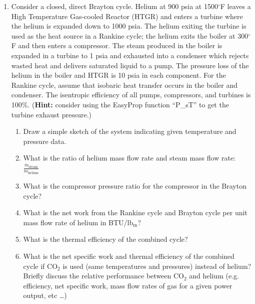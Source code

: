\begin{fullwidth}
\begin{enumerate}
\vspace{1.5 cm}

\item Consider a closed, direct Brayton cycle.  Helium at 900 psia at 1500$^{\circ}$F leaves a High Temperature Gas-cooled Reactor (HTGR) and enters a turbine where the helium is expanded down to 1000 psia.  The helium exiting the turbine is used as the heat source in a Rankine cycle; the helium exits the boiler at 300$^{\circ}$F and then enters a compressor.  The steam produced in the boiler is expanded in a turbine to 1 psia and exhausted into a condenser which rejects wasted heat and delivers saturated liquid to a pump.  The pressure loss of the helium in the boiler and HTGR is 10 psia in each component.  For the Rankine cycle, assume that isobaric heat transfer occurs in the boiler and condenser.  The isentropic efficiency of all pumps, compressors, and turbines is 100\%. (\textbf{Hint:} consider using the EasyProp function ``P\_sT'' to get the turbine exhaust pressure.)

\begin{enumerate}
\item Draw a simple sketch of the system indicating given temperature and pressure data.
\item What is the ratio of helium mass flow rate and steam mass flow rate: $\frac{\dot{m}_{\text{steam}}}{\dot{m}_{\text{helium}}}$
\item What is the compressor pressure ratio for the compressor in the Brayton cycle?
\item What is the net work from the Rankine cycle and Brayton cycle  per unit mass flow rate of helium in BTU/lb$_{\text{m}}$?
\item What is the thermal efficiency of the combined cycle?
\item What is the net specific work and thermal efficiency of the combined cycle if CO$_{2}$ is used (same temperatures and pressures) instead of helium?  Briefly discuss the relative performance between CO$_2$ and helium (e.g. efficiency, net specific work, mass flow rates of gas for a given power output, etc \dots)
\end{enumerate}

\end{enumerate}

\end{fullwidth}
